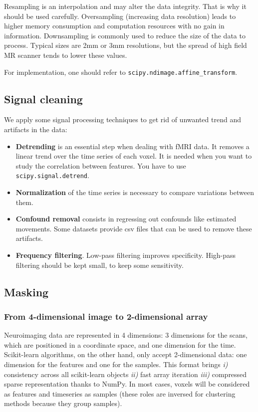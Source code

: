 \documentclass{frontiersSCNS} %
\begin{document}
Resampling is an interpolation and may alter the data integrity. That is
why it should be used carefully. Oversampling (increasing
data resolution) leads to higher memory consumption and computation resources
with no gain in information.
Downsampling is commonly used to reduce the size of the data to process.
Typical sizes are 2mm or 3mm resolutions, but the spread of high field MR
scanner tends to lower these values.

For implementation, one should refer to \texttt{scipy.ndimage.affine\_transform}.

\subsection{Signal cleaning}

We apply some signal processing techniques to get rid of unwanted trend and
artifacts in the data:

\begin{itemize}
    \item{\bf Detrending} is an essential step when dealing with fMRI data. It removes a
linear trend over the time series of each
voxel. It is needed when you want to study the correlation between
features. You have to use \texttt{scipy.signal.detrend}.\\
\item{\bf Normalization} of the time series is necessary to compare variations
between them.\\
\item{\bf Confound removal} consists in regressing out confounds like
estimated movements. Some datasets provide csv files that can be used to remove
these artifacts.\\
\item{\bf Frequency filtering}. Low-pass filtering improves specificity.
High-pass filtering should be kept small, to keep some sensitivity.
\end{itemize}

\subsection{Masking}

\subsubsection{From 4-dimensional image to 2-dimensional array}

Neuroimaging data are represented in 4 dimensions: 3 dimensions for the scans,
which are positioned in a coordinate space, and one dimension for the time.
Scikit-learn algorithms, on the other hand, only accept 2-dimensional data: one
dimension for the features and one for the samples. This format brings \textit{i)}
consistency across all scikit-learn objects \textit{ii)} fast array iteration
\textit{iii)} compressed sparse representation thanks to NumPy.
In most
cases, voxels will be considered as features and timeseries as samples (these
roles are inversed for clustering methods because they group samples).\\
\end{document}

